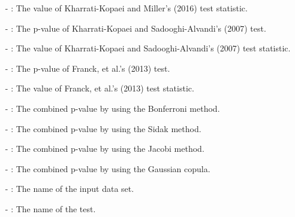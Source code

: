 \begin{itemize}
\begin{itemize}
		\item[-] : The value of Kharrati-Kopaei and Miller's (2016) test statistic.
		\item[-] : The p-value of Kharrati-Kopaei and Sadooghi-Alvandi's (2007) test.
		\item[-] : The value of Kharrati-Kopaei and Sadooghi-Alvandi's (2007) test statistic.
		\item[-] : The p-value of Franck, et al.'s (2013) test.
		\item[-] : The value of Franck, et al.'s (2013) test statistic.
		\item[-] : The combined p-value by using the Bonferroni method.
		\item[-] : The combined p-value by using the Sidak method.
		\item[-] : The combined p-value by using the Jacobi method.
		\item[-] : The combined p-value by using the Gaussian copula.
		\item[-] : The name of the input data set.
		\item[-] : The name of the test.
	\end{itemize}
	
\end{itemize}

